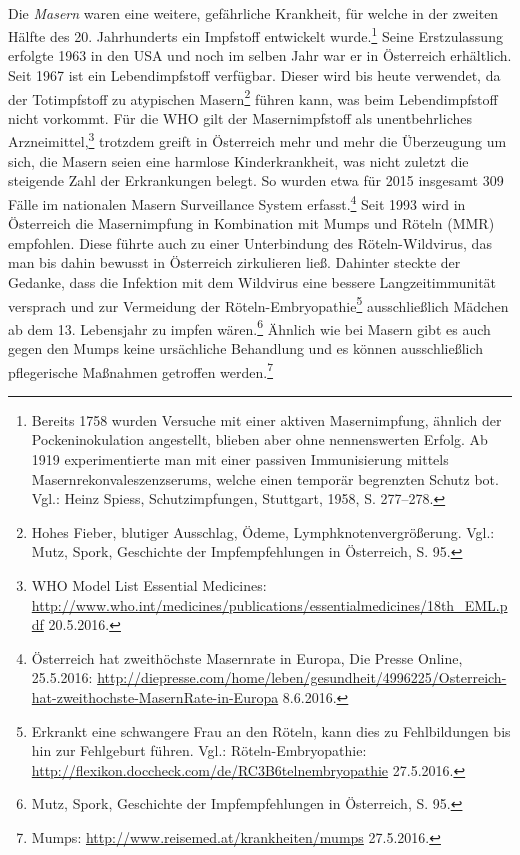 \documentclass[
    a4paper,
    12pt,
    hyphens,
    chapterprefix=true,
    headheight=33pt,
    footheight=29pt,
    headings=optiontohead, %
]{scrartcl}
\begin{document}
\\
Die \textit{Masern} waren eine weitere, gefährliche Krankheit, für welche in der zweiten Hälfte des 20. Jahrhunderts ein Impfstoff entwickelt
wurde.\footnote{Bereits 1758 wurden Versuche mit einer aktiven Masernimpfung, ähnlich der Pockeninokulation angestellt, blieben aber ohne nennenswerten Erfolg. Ab 1919 experimentierte man mit einer passiven Immunisierung mittels Masernrekonvaleszenzserums, welche einen temporär begrenzten Schutz bot. Vgl.: Heinz Spiess, Schutzimpfungen, Stuttgart, 1958, S. 277--278.} Seine Erstzulassung erfolgte 1963 in den USA und noch im selben Jahr war er in Österreich erhältlich. Seit 1967 ist ein
Lebendimpfstoff verfügbar. Dieser wird bis heute verwendet, da der Totimpfstoff
zu atypischen Masern\footnote{Hohes Fieber, blutiger Ausschlag, Ödeme, Lymphknotenvergrößerung. Vgl.: Mutz, Spork, Geschichte
der Impfempfehlungen in Österreich, S. 95.} führen kann, was beim Lebendimpfstoff nicht vorkommt. Für die WHO gilt der Masernimpfstoff als unentbehrliches Arzneimittel,\footnote{WHO Model List Essential Medicines: \url{http://www.who.int/medicines/publications/essentialmedicines/18th_EML.pdf} 20.5.2016.}
trotzdem greift in Österreich mehr und mehr die Überzeugung um sich, die Masern seien eine harmlose Kinderkrankheit, was nicht
zuletzt die steigende Zahl der Erkrankungen belegt. So wurden etwa für 2015 insgesamt 309 Fälle im nationalen Masern Surveillance
System erfasst.\footnote{Österreich hat zweithöchste Masernrate in Europa, Die Presse Online, 25.5.2016:
\url{http://diepresse.com/home/leben/gesundheit/4996225/Osterreich-hat-zweithochste-MasernRate-in-Europa} 8.6.2016.}
Seit 1993 wird in Österreich die Masernimpfung in Kombination mit Mumps und Röteln (MMR) empfohlen. Diese
führte auch zu einer Unterbindung des Röteln-Wildvirus, das man bis dahin bewusst in Österreich zirkulieren ließ.
Dahinter steckte der Gedanke, dass die Infektion mit dem Wildvirus eine bessere Langzeitimmunität versprach und zur Vermeidung der
Röteln-Embryopathie\footnote{Erkrankt eine schwangere Frau an den Röteln, kann dies zu Fehlbildungen bis hin zur Fehlgeburt führen.
Vgl.: Röteln-Embryopathie: \url{http://flexikon.doccheck.com/de/RC3B6telnembryopathie} 27.5.2016.} ausschließlich Mädchen
ab dem 13. Lebensjahr zu impfen wären.\footnote{Mutz, Spork, Geschichte der Impfempfehlungen in Österreich, S. 95.}
Ähnlich wie bei Masern gibt es auch gegen den Mumps keine ursächliche Behandlung und es können ausschließlich
pflegerische Maßnahmen getroffen werden.\footnote{Mumps: \url{http://www.reisemed.at/krankheiten/mumps} 27.5.2016.}\\
\end{document}
